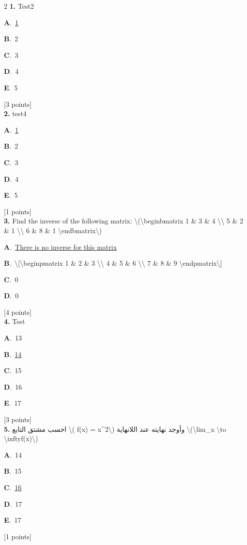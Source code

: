 \documentclass[12pt]{article}
\newcommand{\choice}[3]{%
  \noindent\textbf{#1}.~#2\hfill#3\par\vspace{0.25em}
}
\begin{document}
\begin{multicols}{2}
\noindent \textbf{\textenglish{1.}} {\textenglish{Test2}}

\noindent\choice{A}{\underline{{\textenglish{1}}}}{}
\noindent\choice{B}{{\textenglish{2}}}{}
\noindent\choice{C}{{\textenglish{3}}}{}
\noindent\choice{D}{{\textenglish{4}}}{}
\noindent\choice{E}{{\textenglish{5}}}{}
\hfill {\textenglish{[3 points]}}\\[0.5em]

\noindent \textbf{\textenglish{2.}} {\textenglish{test4}}

\noindent\choice{A}{\underline{{\textenglish{1}}}}{}
\noindent\choice{B}{{\textenglish{2}}}{}
\noindent\choice{C}{{\textenglish{3}}}{}
\noindent\choice{D}{{\textenglish{4}}}{}
\noindent\choice{E}{{\textenglish{5}}}{}
\hfill {\textenglish{[1 points]}}\\[0.5em]

\noindent \textbf{\textenglish{3.}} {\textenglish{Find the inverse of the following matrix: \textbackslash{}(\textbackslash{}begin{bmatrix} 1 \& 3 \& 4 \textbackslash{}\textbackslash{} 5 \& 2 \& 1 \textbackslash{}\textbackslash{} 6 \& 8 \& 1 \textbackslash{}end{bmatrix}\textbackslash{})}}

\noindent\choice{A}{\underline{{\textenglish{There is no inverse for this matrix}}}}{}
\noindent\choice{B}{{\textenglish{\textbackslash{}[\textbackslash{}begin{pmatrix} 1 \& 2 \& 3 \textbackslash{}\textbackslash{} 4 \& 5 \& 6 \textbackslash{}\textbackslash{} 7 \& 8 \& 9  \textbackslash{}end{pmatrix}\textbackslash{}]}}}{}
\noindent\choice{C}{{\textenglish{0}}}{}
\noindent\choice{D}{{\textenglish{0}}}{}
\hfill {\textenglish{[4 points]}}\\[0.5em]

\noindent \textbf{\textenglish{4.}} {\textenglish{Test}}

\noindent\choice{A}{{\textenglish{13}}}{}
\noindent\choice{B}{\underline{{\textenglish{14}}}}{}
\noindent\choice{C}{{\textenglish{15}}}{}
\noindent\choice{D}{{\textenglish{16}}}{}
\noindent\choice{E}{{\textenglish{17}}}{}
\hfill {\textenglish{[3 points]}}\\[0.5em]

\noindent \textbf{\textenglish{5.}} {\textarabic{احسب مشتق التابع \textbackslash{}( f(x) = x\^{}2\textbackslash{}) وأوجد نهايته عند اللانهاية \textbackslash{}(\textbackslash{}lim\_{x \textbackslash{}to \textbackslash{}infty}f(x)\textbackslash{})}}

\noindent\choice{A}{{\textenglish{14}}}{}
\noindent\choice{B}{{\textenglish{15}}}{}
\noindent\choice{C}{\underline{{\textenglish{16}}}}{}
\noindent\choice{D}{{\textenglish{17}}}{}
\noindent\choice{E}{{\textenglish{17}}}{}
\hfill {\textenglish{[1 points]}}\\[0.5em]


\end{multicols}
\end{document}
